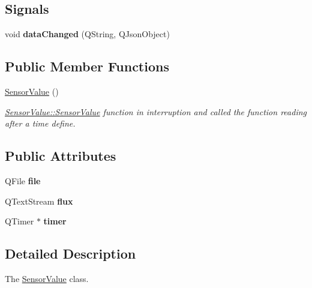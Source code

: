\subsection*{Signals}
\begin{DoxyCompactItemize}
\item 
\mbox{\label{classSensorValue_a3bc68cb111e1111f6f00495eac3c4cb4}} 
void {\bfseries data\+Changed} (Q\+String, Q\+Json\+Object)
\end{DoxyCompactItemize}
\subsection*{Public Member Functions}
\begin{DoxyCompactItemize}
\item 
\hyperlink{classSensorValue_aed70ed5c17088bb9b420d9d63b9379bd}{Sensor\+Value} ()
\begin{DoxyCompactList}\small\item\em \hyperlink{classSensorValue_aed70ed5c17088bb9b420d9d63b9379bd}{Sensor\+Value\+::\+Sensor\+Value} function in interruption and called the function reading after a time define. \end{DoxyCompactList}\end{DoxyCompactItemize}
\subsection*{Public Attributes}
\begin{DoxyCompactItemize}
\item 
\mbox{\label{classSensorValue_ac36ee5f0f2cd87e70ea805fd60642b9f}} 
Q\+File {\bfseries file}
\item 
\mbox{\label{classSensorValue_a3a5569f5301c02e5519ef46c2ed42dfa}} 
Q\+Text\+Stream {\bfseries flux}
\item 
\mbox{\label{classSensorValue_a5d7d0853dfc7e6a107addcd5b0f367a9}} 
Q\+Timer $\ast$ {\bfseries timer}
\end{DoxyCompactItemize}


\subsection{Detailed Description}
The \hyperlink{classSensorValue}{Sensor\+Value} class. 

